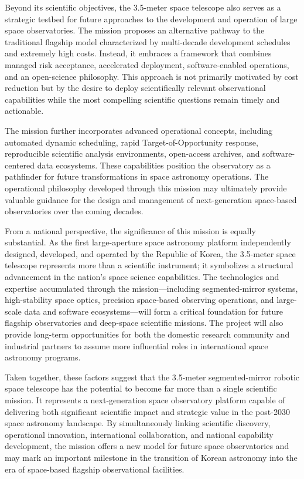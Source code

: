 Beyond its scientific objectives, the 3.5-meter space telescope also serves as a strategic testbed for future approaches to the development and operation of large space observatories. The mission proposes an alternative pathway to the traditional flagship model characterized by multi-decade development schedules and extremely high costs. Instead, it embraces a framework that combines managed risk acceptance, accelerated deployment, software-enabled operations, and an open-science philosophy. This approach is not primarily motivated by cost reduction but by the desire to deploy scientifically relevant observational capabilities while the most compelling scientific questions remain timely and actionable.

The mission further incorporates advanced operational concepts, including automated dynamic scheduling, rapid Target-of-Opportunity response, reproducible scientific analysis environments, open-access archives, and software-centered data ecosystems. These capabilities position the observatory as a pathfinder for future transformations in space astronomy operations. The operational philosophy developed through this mission may ultimately provide valuable guidance for the design and management of next-generation space-based observatories over the coming decades.

From a national perspective, the significance of this mission is equally substantial. As the first large-aperture space astronomy platform independently designed, developed, and operated by the Republic of Korea, the 3.5-meter space telescope represents more than a scientific instrument; it symbolizes a structural advancement in the nation's space science capabilities. The technologies and expertise accumulated through the mission---including segmented-mirror systems, high-stability space optics, precision space-based observing operations, and large-scale data and software ecosystems---will form a critical foundation for future flagship observatories and deep-space scientific missions. The project will also provide long-term opportunities for both the domestic research community and industrial partners to assume more influential roles in international space astronomy programs.

Taken together, these factors suggest that the 3.5-meter segmented-mirror robotic space telescope has the potential to become far more than a single scientific mission. It represents a next-generation space observatory platform capable of delivering both significant scientific impact and strategic value in the post-2030 space astronomy landscape. By simultaneously linking scientific discovery, operational innovation, international collaboration, and national capability development, the mission offers a new model for future space observatories and may mark an important milestone in the transition of Korean astronomy into the era of space-based flagship observational facilities.

